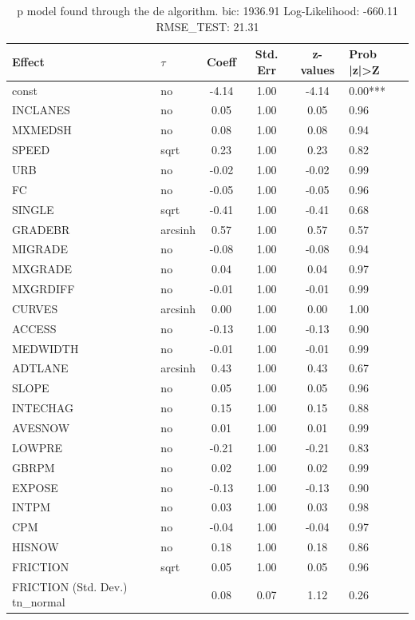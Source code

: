 \begin{table}
	\caption{p model found through the de algorithm. bic: 1936.91 Log-Likelihood: -660.11 RMSE_TEST: 21.31}
	\begin{center}
		\begin{tabular}{|l|l|c|c|c|l|}
			\hline
			Effect & $\tau$ & Coeff & Std. Err & z-values & Prob |z|>Z \\
			\hline
			const & no & -4.14 & 1.00 & -4.14 & 0.00*** \\
			\hline
			INCLANES & no & 0.05 & 1.00 & 0.05 & 0.96 \\
			\hline
			MXMEDSH & no & 0.08 & 1.00 & 0.08 & 0.94 \\
			\hline
			SPEED & sqrt & 0.23 & 1.00 & 0.23 & 0.82 \\
			\hline
			URB & no & -0.02 & 1.00 & -0.02 & 0.99 \\
			\hline
			FC & no & -0.05 & 1.00 & -0.05 & 0.96 \\
			\hline
			SINGLE & sqrt & -0.41 & 1.00 & -0.41 & 0.68 \\
			\hline
			GRADEBR & arcsinh & 0.57 & 1.00 & 0.57 & 0.57 \\
			\hline
			MIGRADE & no & -0.08 & 1.00 & -0.08 & 0.94 \\
			\hline
			MXGRADE & no & 0.04 & 1.00 & 0.04 & 0.97 \\
			\hline
			MXGRDIFF & no & -0.01 & 1.00 & -0.01 & 0.99 \\
			\hline
			CURVES & arcsinh & 0.00 & 1.00 & 0.00 & 1.00 \\
			\hline
			ACCESS & no & -0.13 & 1.00 & -0.13 & 0.90 \\
			\hline
			MEDWIDTH & no & -0.01 & 1.00 & -0.01 & 0.99 \\
			\hline
			ADTLANE & arcsinh & 0.43 & 1.00 & 0.43 & 0.67 \\
			\hline
			SLOPE & no & 0.05 & 1.00 & 0.05 & 0.96 \\
			\hline
			INTECHAG & no & 0.15 & 1.00 & 0.15 & 0.88 \\
			\hline
			AVESNOW & no & 0.01 & 1.00 & 0.01 & 0.99 \\
			\hline
			LOWPRE & no & -0.21 & 1.00 & -0.21 & 0.83 \\
			\hline
			GBRPM & no & 0.02 & 1.00 & 0.02 & 0.99 \\
			\hline
			EXPOSE & no & -0.13 & 1.00 & -0.13 & 0.90 \\
			\hline
			INTPM & no & 0.03 & 1.00 & 0.03 & 0.98 \\
			\hline
			CPM & no & -0.04 & 1.00 & -0.04 & 0.97 \\
			\hline
			HISNOW & no & 0.18 & 1.00 & 0.18 & 0.86 \\
			\hline
			FRICTION & sqrt & 0.05 & 1.00 & 0.05 & 0.96 \\
			\hline
			FRICTION (Std. Dev.) tn_normal &  & 0.08 & 0.07 & 1.12 & 0.26 \\
			\hline
		\end{tabular}
	\end{center}
\end{table}